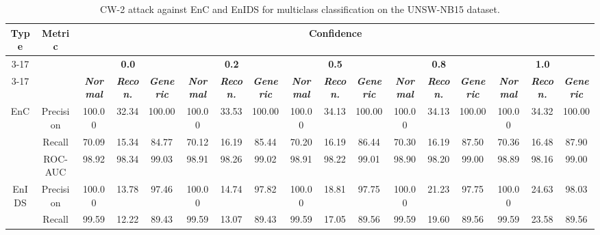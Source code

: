 \documentclass[conference]{IEEEtran}
\begin{document}
	
	\begin{table}[H]
		\caption{CW-2 attack against EnC and EnIDS for multiclass classification on the UNSW-NB15 dataset.}
		\small
		\setlength{\tabcolsep}{0.7pt}
		\centering
		\label{tab:unsw_multi_cw}
		\hspace*{-1.7cm}		
		\begin{tabular}{|c|c|c|c|c|c|c|c|c|c|c|c|c|c|c|c|c|}
			\hline
			\multirow{4}{*}{\textbf{Type}} & \multirow{4}{*}{\textbf{Metric}}& \multicolumn{15}{c|}{\textbf{Confidence}} \\
			\cline{3-17}
			&  & \multicolumn{3}{c|}{\textbf{0.0}} & \multicolumn{3}{c|}{\textbf{0.2}} & \multicolumn{3}{c|}{\textbf{0.5}} & \multicolumn{3}{c|}{\textbf{0.8}} & \multicolumn{3}{c|}{\textbf{1.0}} 
			\\
			\cline{3-17}
			&  & \textbf{\textsl{Normal}} & \textbf{\textsl{Recon.}} & \textbf{\textsl{Generic}} & \textbf{\textsl{Normal}} & \textbf{\textsl{Recon.}} & \textbf{\textsl{Generic}} & \textbf{\textsl{Normal}} & \textbf{\textsl{Recon.}} & \textbf{\textsl{Generic}} & \textbf{\textsl{Normal}} & \textbf{\textsl{Recon.}} & \textbf{\textsl{Generic}} & \textbf{\textsl{Normal}} & \textbf{\textsl{Recon.}} & \textbf{\textsl{Generic}}
			\\
			\hline
			\multirow{3}{*}{EnC} & Precision & 100.00 & 32.34 & 100.00 & 100.00 & 33.53 & 100.00 & 100.00 & 34.13 & 100.00 & 100.00 & 34.13 & 100.00 & 100.00 & 34.32 & 100.00
			\\
			
			& Recall & 70.09 & 15.34 & 84.77 & 70.12 & 16.19 & 85.44 & 70.20 & 16.19 & 86.44 & 70.30 & 16.19 & 87.50 & 70.36 & 16.48 & 87.90
			\\
			
			& ROC-AUC & 98.92 & 98.34 & 99.03 & 98.91 & 98.26 & 99.02 & 98.91 & 98.22 & 99.01 & 98.90 & 98.20 & 99.00 & 98.89 & 98.16 & 99.00
			\\
			\hline
			\multirow{3}{*}{EnIDS} & Precision & \cellcolor{blue!20}100.00 & 13.78 & 97.46 & \cellcolor{blue!20}100.00 & 14.74 & 97.82 & \cellcolor{blue!20}100.00 & 18.81 & 97.75 & \cellcolor{blue!20}100.00 & 21.23 & 97.75 & \cellcolor{blue!20}100.00 & 24.63 & 98.03
			\\
			
			& Recall & \cellcolor{yellow!50}99.59 & 12.22 & \cellcolor{yellow!50}89.43 & \cellcolor{yellow!50}99.59 & 13.07 & \cellcolor{yellow!50}89.43 & \cellcolor{yellow!50}99.59 & 17.05 & \cellcolor{yellow!50}89.56 & \cellcolor{yellow!50}99.59 & 19.60 & \cellcolor{yellow!50}89.56 & \cellcolor{yellow!50}99.59 & 23.58 & \cellcolor{yellow!50}89.56
			\\
			

\end{tabular}
\end{table}
\end{document}

